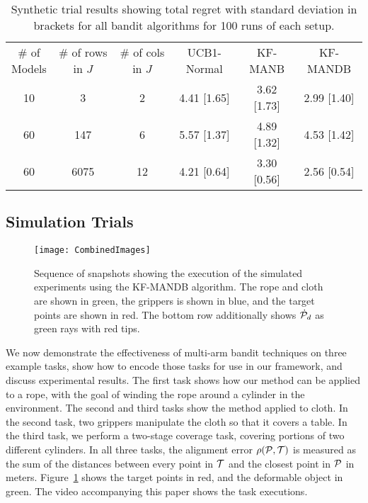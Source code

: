 \begin{table}[ht]
\centering
\caption{Synthetic trial results showing total regret with standard deviation in brackets for all bandit algorithms for 100 runs of each setup.}
\label{tab:synthetic_results}
\begin{tabular}{cccccc}
\hline\noalign{\smallskip}
\makecell{\# of\\Models} & \makecell{\# of rows\\in $J$}    & \makecell{\# of cols\\in $J$} & UCB1-Normal & KF-MANB     & KF-MANDB \\
\noalign{\smallskip}\hline\noalign{\smallskip}
10                      & 3                                 & 2                             & 4.41 [1.65] & 3.62 [1.73] & 2.99 [1.40] \\
60                      & 147                               & 6                             & 5.57 [1.37] & 4.89 [1.32] & 4.53 [1.42] \\
60                      & 6075                              & 12                            & 4.21 [0.64] & 3.30 [0.56] & 2.56 [0.54] \\
\hline
\end{tabular}
\end{table}


\subsection{Simulation Trials}

\begin{figure}[t]
    \centering
    \texttt{[image: CombinedImages]}
    \caption{Sequence of snapshots showing the execution of the simulated experiments using the KF-MANDB algorithm. The rope and cloth are shown in green, the grippers is shown in blue, and the target points are shown in red. The bottom row additionally shows $\dot{\mathcal{P}}_d$ as green rays with red tips.}
    \label{fig:simulation_task_screenshots}
\end{figure}

We now demonstrate the effectiveness of multi-arm bandit techniques on three example tasks, show how to encode those tasks for use in our framework, and discuss experimental results. The first task shows how our method can be applied to a rope, with the goal of winding the rope around a cylinder in the environment. The second and third tasks show the method applied to cloth. In the second task, two grippers manipulate the cloth so that it covers a table. In the third task, we perform a two-stage coverage task, covering portions of two different cylinders. In all three tasks, the alignment error $\rho(\mathcal{P}, \mathcal{T})$ is measured as the sum of the distances between every point in $\mathcal{T}$ and the closest point in $\mathcal{P}$ in meters. Figure~\ref{fig:simulation_task_screenshots} shows the target points in red, and the deformable object in green. The video accompanying this paper shows the task executions.


